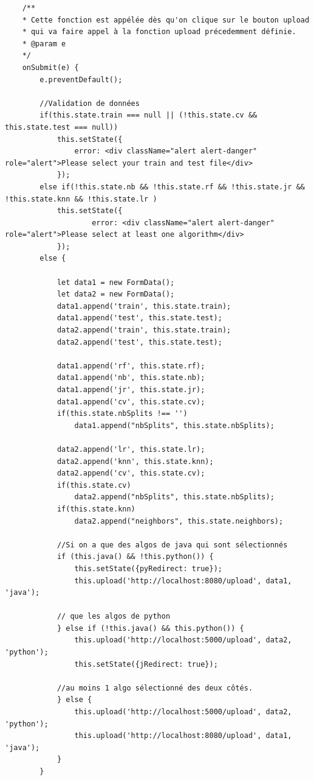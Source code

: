 \documentclass[a4paper,11pt]{article}
\begin{document}
\begin{itemize}
\begin{itemize}
\begin{verbatim}
    /**
    * Cette fonction est appélée dès qu'on clique sur le bouton upload
    * qui va faire appel à la fonction upload précedemment définie.
    * @param e
    */
    onSubmit(e) {
        e.preventDefault();

        //Validation de données
        if(this.state.train === null || (!this.state.cv && this.state.test === null))
            this.setState({
                error: <div className="alert alert-danger" role="alert">Please select your train and test file</div>
            });
        else if(!this.state.nb && !this.state.rf && !this.state.jr && !this.state.knn && !this.state.lr )
            this.setState({
                    error: <div className="alert alert-danger" role="alert">Please select at least one algorithm</div>
            });
        else {

            let data1 = new FormData();
            let data2 = new FormData();
            data1.append('train', this.state.train);
            data1.append('test', this.state.test);
            data2.append('train', this.state.train);
            data2.append('test', this.state.test);

            data1.append('rf', this.state.rf);
            data1.append('nb', this.state.nb);
            data1.append('jr', this.state.jr);
            data1.append('cv', this.state.cv);
            if(this.state.nbSplits !== '')
                data1.append("nbSplits", this.state.nbSplits);

            data2.append('lr', this.state.lr);
            data2.append('knn', this.state.knn);
            data2.append('cv', this.state.cv);
            if(this.state.cv)
                data2.append("nbSplits", this.state.nbSplits);
            if(this.state.knn)
                data2.append("neighbors", this.state.neighbors);

            //Si on a que des algos de java qui sont sélectionnés
            if (this.java() && !this.python()) {
                this.setState({pyRedirect: true});
                this.upload('http://localhost:8080/upload', data1, 'java');

            // que les algos de python
            } else if (!this.java() && this.python()) {
                this.upload('http://localhost:5000/upload', data2, 'python');
                this.setState({jRedirect: true});

            //au moins 1 algo sélectionné des deux côtés.
            } else {
                this.upload('http://localhost:5000/upload', data2, 'python');
                this.upload('http://localhost:8080/upload', data1, 'java');
            }
        }


\end{verbatim}
\end{itemize}
\end{itemize}
\end{document}
